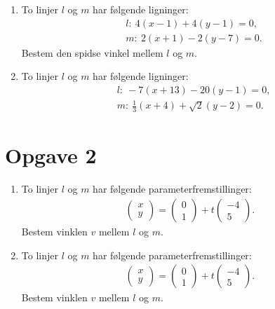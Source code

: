 \begin{enumerate}[label=\roman*)]
	\item To linjer $l$ og $m$ har følgende ligninger:
	\begin{align*}
		&l: \	4(x-1) + 4(y-1) =0,\\
		&m: \ 2(x+1) -2(y-7) = 0.
	\end{align*}	 
	Bestem den spidse vinkel mellem $l$ og $m$. 
	\item To linjer $l$ og $m$ har følgende ligninger:
	\begin{align*}
		&l: \ -7(x+13) - 20(y-1) = 0,\\
		&m: \ \frac{1}{3}(x+4) + \sqrt{2}(y-2) = 0.
	\end{align*}
\end{enumerate}

\section*{Opgave 2}
\begin{enumerate}[label=\roman*)]
	\item To linjer $l$ og $m$ har følgende parameterfremstillinger:
	\begin{align*}
		\begin{pmatrix}
			x \\ y
		\end{pmatrix}=
		\begin{pmatrix}
			0 \\ 1
		\end{pmatrix}+ t
		\begin{pmatrix}
			-4 \\ 5
		\end{pmatrix}.
	\end{align*}
	Bestem vinklen $v$ mellem $l$ og $m$. 
	
	\item To linjer $l$ og $m$ har følgende parameterfremstillinger:
	\begin{align*}
		\begin{pmatrix}
			x \\ y
		\end{pmatrix}=
		\begin{pmatrix}
			0 \\ 1
		\end{pmatrix}+ t
		\begin{pmatrix}
			-4 \\ 5
		\end{pmatrix}.
	\end{align*}
	Bestem vinklen $v$ mellem $l$ og $m$.
\end{enumerate}

